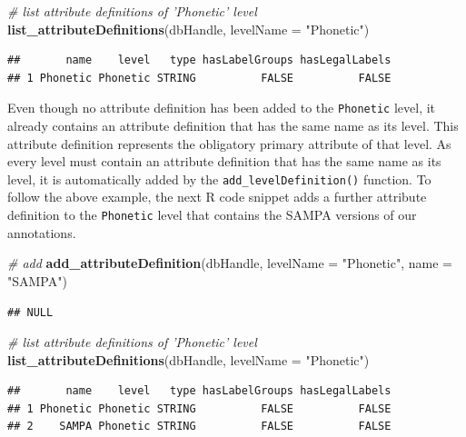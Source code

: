 \documentclass[]{book}
\newenvironment{Shaded}{\begin{snugshade}}{\end{snugshade}}
\newcommand{\CommentTok}[1]{\textcolor[rgb]{0.56,0.35,0.01}{\textit{#1}}}
\newcommand{\DataTypeTok}[1]{\textcolor[rgb]{0.13,0.29,0.53}{#1}}
\newcommand{\KeywordTok}[1]{\textcolor[rgb]{0.13,0.29,0.53}{\textbf{#1}}}
\newcommand{\NormalTok}[1]{#1}
\newcommand{\StringTok}[1]{\textcolor[rgb]{0.31,0.60,0.02}{#1}}
\begin{document}
\begin{Shaded}
\begin{Highlighting}[]
\CommentTok{# list attribute definitions of 'Phonetic' level}
\KeywordTok{list_attributeDefinitions}\NormalTok{(dbHandle,}
                          \DataTypeTok{levelName =} \StringTok{"Phonetic"}\NormalTok{)}
\end{Highlighting}
\end{Shaded}

\begin{verbatim}
##       name    level   type hasLabelGroups hasLegalLabels
## 1 Phonetic Phonetic STRING          FALSE          FALSE
\end{verbatim}

Even though no attribute definition has been added to the \texttt{Phonetic} level, it already contains an attribute definition that has the same name as its level. This attribute definition represents the obligatory primary attribute of that level. As every level must contain an attribute definition that has the same name as its level, it is automatically added by the \texttt{add\_levelDefinition()} function. To follow the above example, the next R code snippet adds a further attribute definition to the \texttt{Phonetic} level that contains the SAMPA versions of our annotations.

\begin{Shaded}
\begin{Highlighting}[]
\CommentTok{# add}
\KeywordTok{add_attributeDefinition}\NormalTok{(dbHandle,}
                        \DataTypeTok{levelName =} \StringTok{"Phonetic"}\NormalTok{,}
                        \DataTypeTok{name =} \StringTok{"SAMPA"}\NormalTok{)}
\end{Highlighting}
\end{Shaded}

\begin{verbatim}
## NULL
\end{verbatim}

\begin{Shaded}
\begin{Highlighting}[]
\CommentTok{# list attribute definitions of 'Phonetic' level}
\KeywordTok{list_attributeDefinitions}\NormalTok{(dbHandle,}
                          \DataTypeTok{levelName =} \StringTok{"Phonetic"}\NormalTok{)}
\end{Highlighting}
\end{Shaded}

\begin{verbatim}
##       name    level   type hasLabelGroups hasLegalLabels
## 1 Phonetic Phonetic STRING          FALSE          FALSE
## 2    SAMPA Phonetic STRING          FALSE          FALSE
\end{verbatim}
\end{document}
